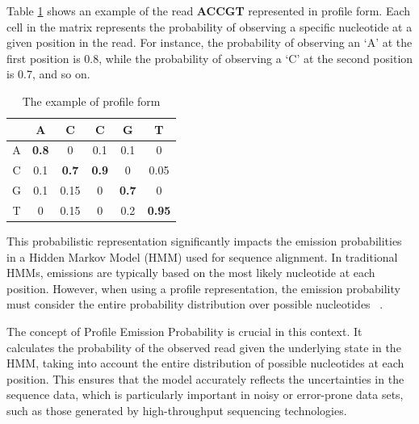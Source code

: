 \documentclass[PhD]{PHlab-thesis}
\begin{document}
Table \ref{tab:profile} shows an example of the read \textbf{ACCGT} represented in profile form. Each cell in the matrix represents the probability of observing a specific nucleotide at a given position in the read. For instance, the probability of observing an `A' at the first position is 0.8, while the probability of observing a `C' at the second position is 0.7, and so on.

\begin{table}[h]
    \centering
    \begin{tabular}{c|ccccc}
         & A & C & C & G & T \\
        \hline
        A & \textbf{0.8} & 0 & 0.1 & 0.1 & 0 \\
        C & 0.1 & \textbf{0.7} & \textbf{0.9} & 0 & 0.05 \\
        G & 0.1 & 0.15 & 0 & \textbf{0.7} & 0 \\
        T & 0 & 0.15 & 0 & 0.2 & \textbf{0.95} \\
    \end{tabular}
    \caption{The example of profile form}
    \label{tab:profile}
\end{table}

This probabilistic representation significantly impacts the emission probabilities in a Hidden Markov Model (HMM) used for sequence alignment. In traditional HMMs, emissions are typically based on the most likely nucleotide at each position. However, when using a profile representation, the emission probability must consider the entire probability distribution over possible nucleotides ~\cite{Profile}.

The concept of Profile Emission Probability is crucial in this context. It calculates the probability of the observed read given the underlying state in the HMM, taking into account the entire distribution of possible nucleotides at each position. This ensures that the model accurately reflects the uncertainties in the sequence data, which is particularly important in noisy or error-prone data sets, such as those generated by high-throughput sequencing technologies.
\end{document}

